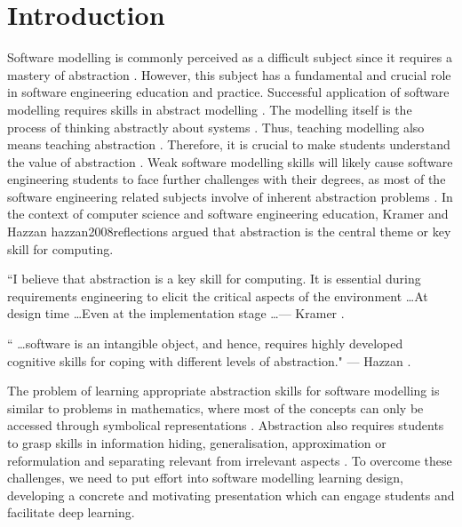 \documentclass[12pt, a4paper]{report}
\begin{document}
\tableofcontents
{}

\chapter{Introduction}

Software modelling is commonly perceived as a difficult subject since it requires a mastery of abstraction \cite{Borstler2012}. However, this subject has a fundamental and crucial role in software engineering education and practice. Successful application of software modelling requires skills in abstract modelling \cite{whittle2013industrial}. The modelling itself is the process of thinking abstractly about systems \cite{bezivin2009teaching}. Thus, teaching modelling also means teaching abstraction \cite{engels2005teaching}. Therefore, it is crucial to make students understand the value of abstraction \cite{bezivin2009teaching}. Weak software modelling skills will likely cause software engineering students to face further challenges with their degrees, as most of the software engineering related subjects involve of inherent abstraction problems \cite{Kramer2007}. In the context of computer science and software engineering education, Kramer \cite{Kramer2007} and Hazzan {hazzan2008reflections} argued that abstraction is the central theme or key skill for computing.

\begin{displayquote}
``I believe that abstraction is a key skill for computing. It is essential during requirements engineering to elicit the critical aspects of the environment \dots At design time \dots Even at the implementation stage \dots --- Kramer \cite{Kramer2007}.
\end{displayquote}

\begin{displayquote}
`` \dots software is an intangible object, and hence, requires highly developed cognitive skills for coping with different levels of abstraction." --- Hazzan \cite{hazzan2008reflections}.
\end{displayquote}

The problem of learning appropriate abstraction skills for software modelling is similar to problems in mathematics, where most of the concepts can only be accessed through symbolical representations \cite{Duval2006}. Abstraction also requires students to grasp skills in information hiding, generalisation, approximation or reformulation and separating relevant from irrelevant aspects \cite{Saitta2013}. To overcome these challenges, we need to put effort into software modelling learning design, developing a concrete and motivating presentation which can engage students and facilitate deep learning.
\end{document}
